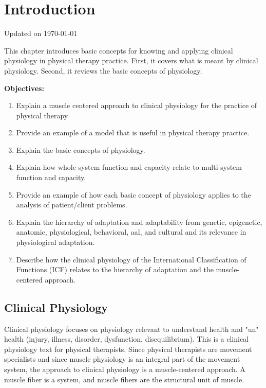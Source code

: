 \chapter{Introduction}\label{chp:introduction}
Updated on \today
\minitoc

This chapter introduces basic concepts for knowing and applying clinical physiology in physical therapy practice. First, it covers what is meant by clinical physiology. Second, it reviews the basic concepts of physiology. 

\begin{svgraybox}
   \textbf{Objectives:}
\begin{enumerate}
    \item Explain a muscle centered approach to clinical physiology for the practice of physical therapy
    \item Provide an example of a model that is useful in physical therapy practice.
    \item Explain the basic concepts of physiology.
    \item Explain how whole system function and capacity relate to multi-system function and capacity. 
    \item Provide an example of how each basic concept of physiology applies to the analysis of patient/client problems.
    \item Explain the hierarchy of adaptation and adaptability from genetic, epigenetic, anatomic, physiological, behavioral, aal, and cultural and its relevance in physiological adaptation.
    \item Describe how the clinical physiology of the International Classification of Functions (ICF) relates to the hierarchy of adaptation and the muscle-centered approach.
\end{enumerate} 
\end{svgraybox}

\section{Clinical Physiology}

Clinical physiology focuses on physiology relevant to understand health and "un" health (injury, illness, disorder, dysfunction, disequilibrium). This is a clinical physiology text for physical therapists. Since physical therapists are movement specialists and since muscle physiology is an integral part of the movement system, the approach to clinical physiology is a muscle-centered approach.  A muscle fiber is a system, and muscle fibers are the structural unit of muscle. 

